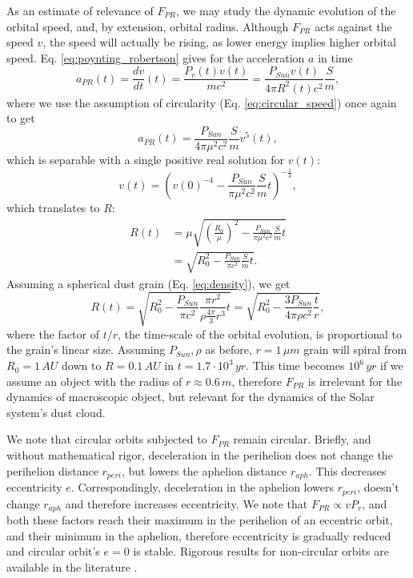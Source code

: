 As an estimate of relevance of $F_{PR}$, we may study the dynamic evolution of the orbital speed, and, by extension, orbital radius. Although $F_{PR}$ acts against the speed $v$, the speed will actually be rising, as lower energy implies higher orbital speed. Eq. \ref{eq:poynting_robertson} gives for the acceleration $a$ in time
\begin{equation}
    a_{PR}(t) = \frac{dv}{dt}(t) = \frac{P_{r}(t)v(t)}{mc^2} = \frac{P_{Sun} v(t) }{4 \pi R^2(t) c^2} \frac{S}{m},
\end{equation}
where we use the assumption of circularity (Eq. \ref{eq:circular_speed}) once again to get
\begin{equation}
    a_{PR}(t) = \frac{P_{Sun}}{4 \pi \mu^2 c^2} \frac{S}{m} v^5(t),
\end{equation}
which is separable with a single positive real solution for $v(t)$:
\begin{equation}
    v(t) = \left( v(0)^{-4} - \frac{P_{Sun}}{\pi \mu^2 c^2} \frac{S}{m} t \right)^{-\frac{1}{4}},
\end{equation}
which translates to $R$:
\begin{equation}\begin{split}
    R(t) &=  \mu \sqrt{ \left(\frac{R_0}{\mu}\right)^{2} - \frac{P_{Sun}}{\pi \mu^2 c^2} \frac{S}{m} t }
    \\ &= \sqrt{R_0^2 - \frac{P_{Sun}}{\pi c^2} \frac{S}{m} t }.
\end{split}\end{equation}
Assuming a spherical dust grain (Eq. \ref{eq:density}), we get
\begin{equation}
    R(t) = \sqrt{R_0^2 - \frac{P_{Sun}}{\pi c^2} \frac{\pi r^2}{\rho \frac{4\pi}{3} r^3} t } = \sqrt{R_0^2 - \frac{3P_{Sun}}{4 \pi \rho c^2} \frac{t}{r} },
    \label{eq:PR_estimate}
\end{equation}
where the factor of $t/r$, the time-scale of the orbital evolution, is proportional to the grain's linear size. Assuming $P_{Sun},\rho$ as before, $r=1\,\si{\mu m}$ grain will spiral from $R_0=1\,\si{AU}$ down to $R=0.1\,\si{AU}$ in $t=1.7 \cdot 10^3\,\si{yr}$. This time becomes $10^6\,\si{yr}$ if we assume an object with the radius of $r \approx 0.6 \, \si{m}$, therefore $F_{PR}$ is irrelevant for the dynamics of macroscopic object, but relevant for the dynamics of the Solar system's dust cloud. 

We note that circular orbits subjected to $F_{PR}$ remain circular. Briefly, and without mathematical rigor, deceleration in the perihelion does not change the perihelion distance $r_{peri}$, but lowers the aphelion distance $r_{aph}$. This decreases eccentricity $e$. Correspondingly, deceleration in the aphelion lowers $r_{peri}$, doesn't change $r_{aph}$ and therefore increases eccentricity. We note that $F_{PR} \propto v P_r$, and both these factors reach their maximum in the perihelion of an eccentric orbit, and their minimum in the aphelion, therefore eccentricity is gradually reduced and circular orbit's $e=0$ is stable. Rigorous results for non-circular orbits are available in the literature \cite{wyatt1950poynting}. 

